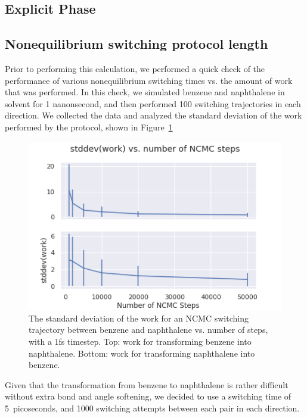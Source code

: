 \subsection{Explicit Phase}
%
\subsection{Nonequilibrium switching protocol length}
%
Prior to performing this calculation, we performed a quick check of the performance of various nonequilibrium switching times vs. the amount of work that was performed.
%
In this check, we simulated benzene and naphthalene in solvent for 1 nanonsecond, and then performed 100 switching trajectories in each direction.
%
We collected the data and analyzed the standard deviation of the work performed by the protocol, shown in Figure~\ref{fig:benz_naph_protocol_work}
%
\begin{figure}
    \centering
    \includegraphics[width=1.0\textwidth]{benz_naph_work_vs_steps.png}
    \caption{The standard deviation of the work for an NCMC switching trajectory between benzene and naphthalene vs. number of steps, with a 1fs timestep. Top: work for transforming benzene into naphthalene. Bottom: work for transforming naphthalene into benzene.}
    \label{fig:benz_naph_protocol_work}
\end{figure}
%
Given that the transformation from benzene to naphthalene is rather difficult without extra bond and angle softening, we decided to use a switching time of 5~picoseconds, and 1000 switching attempts between each pair in each direction.
%
